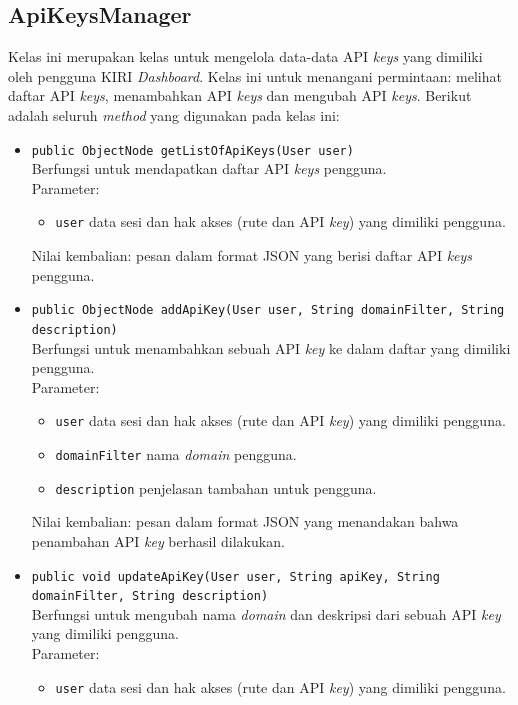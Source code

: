 \subsection{ApiKeysManager}
\label{sec:apikeysmanager}
Kelas ini merupakan kelas untuk mengelola data-data API \textit{keys} yang dimiliki oleh pengguna KIRI \textit{Dashboard}. Kelas ini untuk menangani permintaan: melihat daftar API \textit{keys}, menambahkan API \textit{keys} dan mengubah API \textit{keys}. Berikut adalah seluruh \textit{method} yang digunakan pada kelas ini:
\begin{itemize}
	\item \texttt{public ObjectNode getListOfApiKeys(User user)}\\
	Berfungsi untuk mendapatkan daftar API \textit{keys} pengguna.\\
	Parameter:
	\begin{itemize}
		\item \texttt{user} data sesi dan hak akses (rute dan API \textit{key}) yang dimiliki pengguna.
	\end{itemize}
	Nilai kembalian: pesan dalam format JSON yang berisi daftar API \textit{keys} pengguna.
	\item \texttt{public ObjectNode addApiKey(User user, String domainFilter, String description)}\\
	Berfungsi untuk menambahkan sebuah API \textit{key} ke dalam daftar yang dimiliki pengguna.\\
	Parameter:
	\begin{itemize}
		\item \texttt{user} data sesi dan hak akses (rute dan API \textit{key}) yang dimiliki pengguna.
		\item \texttt{domainFilter} nama \textit{domain} pengguna.
		\item \texttt{description} penjelasan tambahan untuk pengguna.
	\end{itemize}
	Nilai kembalian: pesan dalam format JSON yang menandakan bahwa penambahan API \textit{key} berhasil dilakukan.
	\item \texttt{public void updateApiKey(User user, String apiKey, String domainFilter, String description)}\\
	Berfungsi untuk mengubah nama \textit{domain} dan deskripsi dari sebuah API \textit{key} yang dimiliki pengguna.\\
	Parameter:
	\begin{itemize}
		\item \texttt{user} data sesi dan hak akses (rute dan API \textit{key}) yang dimiliki pengguna.

\end{itemize}
\end{itemize}
